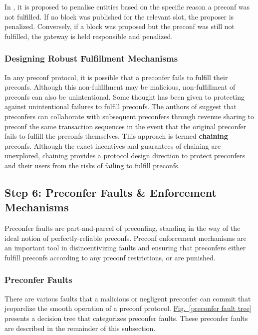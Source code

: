 \documentclass[a4paper]{article}
\theoremstyle{boldstyle}
\begin{document}
In \cite{gateway_trust_liveness}, it is proposed to penalise entities based on the specific reason a preconf was not fulfilled. If no block was published for the relevant slot, the proposer is penalized. Conversely, if a block was proposed but the preconf was still not fulfilled, the gateway is held responsible and penalized.


\subsubsection{Designing Robust Fulfillment Mechanisms}\label{robust_delivery}

    In any preconf protocol, it is possible that a preconfer fails to fulfill their preconfs. Although this non-fulfillment may be malicious, non-fulfillment of preconfs can also be unintentional. Some thought has been given to protecting against unintentional failures to fulfill preconfs. The authors of \cite{W:AvoidingAccidentalLivenessFaultsforBasedPreconfs} suggest that preconfers can collaborate with subsequent preconfers through revenue sharing to preconf the same transaction sequences in the event that the original preconfer fails to fulfill the preconfs themselves. This approach is termed \textbf{chaining} preconfs. Although the exact incentives and guarantees of chaining are unexplored, chaining provides a protocol design direction to protect preconfers and their users from the risks of failing to fulfill preconfs. 
     
    
\subsection{Step 6: Preconfer Faults \& Enforcement Mechanisms} \label{preconfer_punishment}    


    Preconfer faults are part-and-parcel of preconfing, standing in the way of the ideal notion of perfectly-reliable preconfs. Preconf enforcement mechanisms are an important tool in disincentivizing faults and ensuring that preconfers either fulfill preconfs according to any preconf restrictions, or are punished. 
    
    \subsubsection{Preconfer Faults}\label{preconfer_faults_and_punishing_conditions}
    There are various faults that a malicious or negligent preconfer can commit that jeopardize the smooth operation of a preconf protocol. \hyperref[preconfer fault tree]{Fig.~\ref{preconfer fault tree}} presents a decision tree that categorizes preconfer faults. These preconfer faults are described in the remainder of this subsection. 
\end{document}
